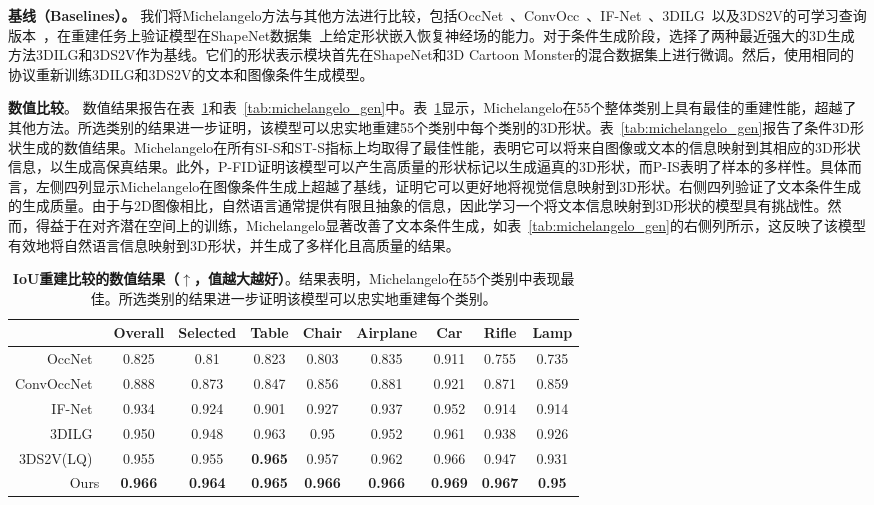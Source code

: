 \documentclass[../../book-main_zh.tex]{subfiles}
\begin{document}
\textbf{基线（Baselines）。}
我们将Michelangelo方法与其他方法进行比较，包括OccNet~\cite{8953655}、ConvOcc~\cite{10.1007/978-3-030-58580-8_31}、IF-Net~\cite{9156292}、3DILG~\cite{NEURIPS2022_894ca1c4}以及3DS2V的可学习查询版本~\cite{10.1145/3592442}，在重建任务上验证模型在ShapeNet数据集~\cite{chang2015shapenet}上给定形状嵌入恢复神经场的能力。对于条件生成阶段，选择了两种最近强大的3D生成方法3DILG和3DS2V作为基线。它们的形状表示模块首先在ShapeNet和3D Cartoon Monster的混合数据集上进行微调。然后，使用相同的协议重新训练3DILG和3DS2V的文本和图像条件生成模型。

\textbf{数值比较}。
数值结果报告在表~\ref{tab:michelangelo_recon}和表~\ref{tab:michelangelo_gen}中。表~\ref{tab:michelangelo_recon}显示，Michelangelo在55个整体类别上具有最佳的重建性能，超越了其他方法。所选类别的结果进一步证明，该模型可以忠实地重建55个类别中每个类别的3D形状。表~\ref{tab:michelangelo_gen}报告了条件3D形状生成的数值结果。Michelangelo在所有SI-S和ST-S指标上均取得了最佳性能，表明它可以将来自图像或文本的信息映射到其相应的3D形状信息，以生成高保真结果。此外，P-FID证明该模型可以产生高质量的形状标记以生成逼真的3D形状，而P-IS表明了样本的多样性。具体而言，左侧四列显示Michelangelo在图像条件生成上超越了基线，证明它可以更好地将视觉信息映射到3D形状。右侧四列验证了文本条件生成的生成质量。由于与2D图像相比，自然语言通常提供有限且抽象的信息，因此学习一个将文本信息映射到3D形状的模型具有挑战性。然而，得益于在对齐潜在空间上的训练，Michelangelo显著改善了文本条件生成，如表~\ref{tab:michelangelo_gen}的右侧列所示，这反映了该模型有效地将自然语言信息映射到3D形状，并生成了多样化且高质量的结果。

\begin{table}[th]
\centering
\resizebox{1\columnwidth}{!}
{
    \begin{tabular}{rcccccccc}
        \hline
        & Overall & Selected & Table & Chair & Airplane & Car & Rifle
        & Lamp   \\ \hline
        OccNet~\cite{8953655}
        & 0.825 & 0.81 & 0.823 & 0.803 & 0.835 & 0.911 & 0.755 & 0.735  \\
        ConvOccNet~\cite{10.1007/978-3-030-58580-8_31}
        & 0.888 & 0.873 & 0.847 & 0.856 & 0.881 & 0.921 & 0.871 & 0.859  \\
        IF-Net~\cite{9156292}
        & 0.934 & 0.924 & 0.901 & 0.927 & 0.937 & 0.952 & 0.914 & 0.914 \\
        3DILG~\cite{NEURIPS2022_894ca1c4}
        & 0.950 & 0.948 & 0.963 & 0.95 & 0.952 & 0.961 & 0.938 & 0.926 \\
        3DS2V(LQ)~\cite{10.1145/3592442}
        & 0.955 & 0.955 & \textbf{0.965} & 0.957 & 0.962 & 0.966 &
        0.947 & 0.931 \\
        Ours
        & \textbf{0.966} & \textbf{0.964} & \textbf{0.965} &
        \textbf{0.966} & \textbf{0.966} & \textbf{0.969} &
        \textbf{0.967} & \textbf{0.95} \\ \hline
    \end{tabular}
}
\caption{\textbf{IoU重建比较的数值结果（$\uparrow$，值越大越好）}。结果表明，Michelangelo在55个类别中表现最佳。所选类别的结果进一步证明该模型可以忠实地重建每个类别。}
\label{tab:michelangelo_recon}
\end{table}
\end{document}
